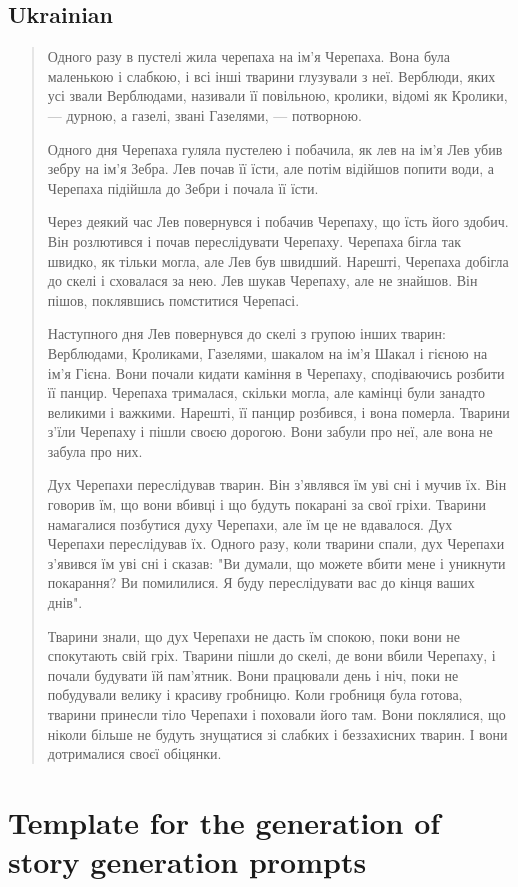 \subsection{Ukrainian}
\blockquote{
Одного разу в пустелі жила черепаха на ім'я Черепаха. Вона була маленькою і слабкою, і всі інші тварини глузували з неї. Верблюди, яких усі звали Верблюдами, називали її повільною, кролики, відомі як Кролики, — дурною, а газелі, звані Газелями, — потворною.

Одного дня Черепаха гуляла пустелею і побачила, як лев на ім'я Лев убив зебру на ім'я Зебра. Лев почав її їсти, але потім відійшов попити води, а Черепаха підійшла до Зебри і почала її їсти.

Через деякий час Лев повернувся і побачив Черепаху, що їсть його здобич. Він розлютився і почав переслідувати Черепаху. Черепаха бігла так швидко, як тільки могла, але Лев був швидший.
Нарешті, Черепаха добігла до скелі і сховалася за нею. Лев шукав Черепаху, але не знайшов. Він пішов, поклявшись помститися Черепасі.

Наступного дня Лев повернувся до скелі з групою інших тварин: Верблюдами, Кроликами, Газелями, шакалом на ім'я Шакал і гієною на ім'я Гієна. Вони почали кидати каміння в Черепаху, сподіваючись розбити її панцир.
Черепаха трималася, скільки могла, але камінці були занадто великими і важкими. Нарешті, її панцир розбився, і вона померла.
Тварини з'їли Черепаху і пішли своєю дорогою. Вони забули про неї, але вона не забула про них.

Дух Черепахи переслідував тварин. Він з'являвся їм уві сні і мучив їх. Він говорив їм, що вони вбивці і що будуть покарані за свої гріхи.
Тварини намагалися позбутися духу Черепахи, але їм це не вдавалося. Дух Черепахи переслідував їх.
Одного разу, коли тварини спали, дух Черепахи з'явився їм уві сні і сказав: "Ви думали, що можете вбити мене і уникнути покарання? Ви помилилися. Я буду переслідувати вас до кінця ваших днів".

Тварини знали, що дух Черепахи не дасть їм спокою, поки вони не спокутають свій гріх.
Тварини пішли до скелі, де вони вбили Черепаху, і почали будувати їй пам'ятник. Вони працювали день і ніч, поки не побудували велику і красиву гробницю.
Коли гробниця була готова, тварини принесли тіло Черепахи і поховали його там. Вони поклялися, що ніколи більше не будуть знущатися зі слабких і беззахисних тварин. І вони дотрималися своєї обіцянки.
}


\section{Template for the generation of story generation prompts}
\label{app:cbt-ua-prompt}

